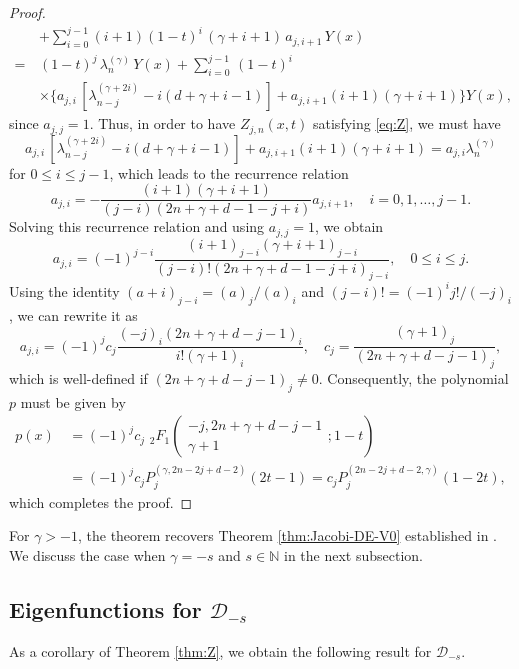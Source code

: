 \documentclass{amsart}
\theoremstyle{remark}
\def\g{{\gamma}}
\def\CD{{\mathcal D}}
\def\NN{{\mathbb N}}
\begin{document}
\begin{proof}
\begin{align*}
&+\sum_{i=0}^{j-1} (i+1)(1-t)^{i}\,(\gamma+i+1) \,a_{j,i+1}\,Y(x)\\
= \,  & (1-t)^j \,\lambda_n^{(\gamma)}\,Y(x) +\sum_{i=0}^{j-1} \,(1-t)^i \\
& \times \{a_{j,i} \,[\lambda_{n-j}^{(\gamma+2i)} - i(d+\gamma+i-1)] + a_{j,i+1}(i+1)(\gamma+i+1)\}Y(x),
\end{align*}
since $a_{j,j} = 1$. Thus, in order to have $Z_{j,n} (x,t)$ satisfying \eqref{eq:Z}, we must have
$$
a_{j,i} \,[\lambda_{n-j}^{(\gamma+2i)} - i(d+\gamma+i-1)] + a_{j,i+1}(i+1)(\gamma+i+1) = a_{j,i} \lambda_n^{(\gamma)}
$$
for $0 \le i \le j-1$, which leads to the recurrence relation
$$
a_{j,i}  = - \frac{(i+1)(\gamma+i+1)}{(j-i)(2n+\gamma+d-1-j+i)}a_{j,i+1} , \quad i=0, 1, \ldots, j-1.
$$
Solving this recurrence relation and using $a_{j,j}  = 1$, we obtain
\begin{equation}\label{def:a}
a_{j,i} = (-1)^{j-i}\frac{(i+1)_{j-i}(\gamma+i+1)_{j-i}}{(j-i)!(2n+\gamma+d- 1-j+i)_{j-i}}, \quad 0\leq i \leq j.
\end{equation}
Using the identity $(a+i)_{j-i} = (a)_j/(a)_i$ and $(j-i)! = (-1)^i j! / (-j)_i$, we can rewrite it as
$$
 a_{j,i} = (-1)^j c_j \frac{(-j)_i (2n+\g+d-j-1)_i}{i! (\g+1)_i}, \quad c_j= \frac{(\g+1)_j}{(2n+\g+d-j-1)_j},
$$
which is well-defined if $(2n+\g+d-j-1)_j \ne 0$. Consequently, the polynomial $p$ must be given by
\begin{align*}
 p(x) \,& = (-1)^j c_j
    \phantom{i}_2F_1\left ( \begin{matrix} -j, 2n+\g+d-j-1 \\ \g+1 \end{matrix}; 1-t \right) \\
& = (-1)^jc_j P_j^{(\g, 2n-2j+d-2)}(2t-1) =
      c_j P_j^{(2n-2j+d-2, \g)}(1-2t),
\end{align*}
which completes the proof.
\end{proof}

For $\g > -1$, the theorem recovers Theorem \ref{thm:Jacobi-DE-V0} established in \cite{X20}. We discuss the case
when $\g  = -s$ and $s \in \NN$ in the next subsection.

\subsection{Eigenfunctions for $\CD_{-s}$}
As a corollary of Theorem \ref{thm:Z}, we obtain the following result for $\CD_{-s}$.
\end{document}
